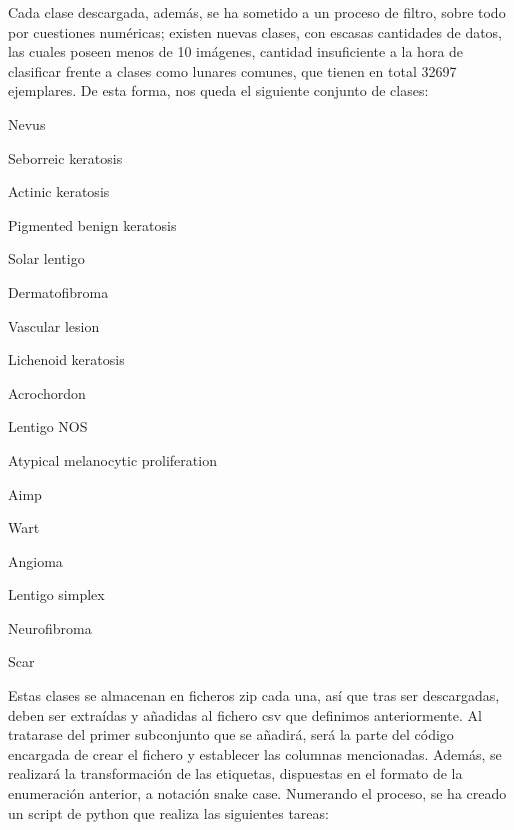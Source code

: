 Cada clase descargada, además, se ha sometido a un proceso de filtro, sobre todo por cuestiones numéricas; existen nuevas clases, con escasas cantidades de datos, las cuales poseen menos de 10 imágenes, cantidad insuficiente a la hora de clasificar frente a clases como lunares comunes, que tienen en total 32697 ejemplares. De esta forma, nos queda el siguiente conjunto de clases:
\begin{multiitem}
	\item Nevus
	\item Seborreic keratosis            
	 \item Actinic keratosis            
	\item Pigmented benign keratosis         
	\item Solar lentigo                           
	\item Dermatofibroma                          
	\item Vascular lesion                         
	\item Lichenoid keratosis                     
	\item Acrochordon                             
	\item Lentigo NOS                             
	\item Atypical melanocytic proliferation       
	\item Aimp                                     
	\item 	Wart                                     
	\item Angioma                                  
	\item Lentigo simplex                          
	\item 	Neurofibroma                             
	 \item 	Scar 
\end{multiitem}

Estas clases se almacenan en ficheros zip cada una, así que tras ser descargadas, deben ser extraídas y añadidas al fichero csv que definimos anteriormente. Al tratarase del primer subconjunto que se añadirá, será la parte del código encargada de crear el fichero y establecer las columnas mencionadas. Además, se realizará la transformación de las etiquetas, dispuestas en el formato de la enumeración anterior, a notación snake case. Numerando el proceso, se ha creado un script de python que realiza las siguientes tareas:

